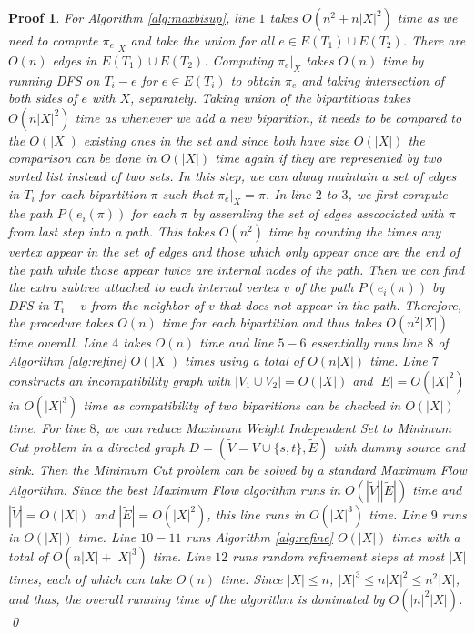 \documentclass{bmcart}
\theoremstyle{mystyle}
\theoremstyle{proofstyle}
\newtheorem*{proof2}{Proof}
\newenvironment{proofnospace}{\begin{proof2}}{\qed \end{proof2}}
\begin{document}
\begin{proofnospace}
For Algorithm \ref{alg:maxbisup}, line $1$ takes $O(n^2+ n|X|^2)$ time as we need to compute $\pi_e|_X$ and take the union for all $e \in E(T_1) \cup E(T_2)$. There are $O(n)$ edges in $E(T_1) \cup E(T_2)$. Computing $\pi_e|_X$ takes $O(n)$ time by running DFS on $T_i - e$ for $e \in E(T_i)$ to obtain $\pi_e$ and taking intersection of both sides of $e$ with $X$, separately. Taking union of the bipartitions takes $O(n |X|^2)$ time as whenever we add a new biparition, it needs to be compared to the $O(|X|)$ existing ones in the set and since both have size $O(|X|)$ the comparison can be done in $O(|X|)$ time again if they are represented by two sorted list instead of two sets. In this step, we can alway maintain a set of edges in $T_i$ for each bipartition $\pi$ such that $\pi_e|_X = \pi$. In line $2$ to $3$, we first compute the path $P(e_i(\pi))$ for each $\pi$ by assemling the set of edges asscociated with $\pi$ from last step into a path. This takes $O(n^2)$ time by counting the times any vertex appear in the set of edges and those which only appear once are the end of the path while those appear twice are internal nodes of the path. Then we can find the extra subtree attached to each internal vertex $v$ of the path $P(e_i(\pi))$ by DFS in $T_i - v$ from the neighbor of $v$ that does not appear in the path. Therefore, the procedure takes $O(n)$ time for each bipartition and thus takes $O(n^2|X|)$ time overall. Line $4$ takes $O(n)$ time and line $5-6$ essentially runs line $8$ of Algorithm \ref{alg:refine} $O(|X|)$ times using a total of $O(n|X|)$ time. Line $7$ constructs an incompatibility graph with $|V_1\cup V_2| = O(|X|)$ and $|E| = O(|X|^2)$ in $O(|X|^3)$ time as compatibility of two biparitions can be checked in $O(|X|)$ time. For line $8$, we can reduce Maximum Weight Independent Set to Minimum Cut problem in a directed graph $D = (\tilde{V} = V \cup \{s,t\}, \tilde{E})$ with dummy source and sink. Then the Minimum Cut problem can be solved by a standard Maximum Flow Algorithm. Since the best Maximum Flow algorithm runs in $O(|\tilde{V}||\tilde{E}|)$ time and $|\tilde{V}| = O(|X|)$ and $|\tilde{E}| = O(|X|^2)$, this line runs in $O(|X|^3)$ time. Line $9$ runs in $O(|X|)$ time. Line $10-11$ runs Algorithm \ref{alg:refine} $O(|X|)$ times with a total of $O(n|X|+|X|^3)$ time. Line $12$ runs random refinement steps at most $|X|$ times, each of which can take $O(n)$ time. Since $|X| \le n$, $|X|^3 \le n|X|^2 \le n^2|X|$, and thus, the overall running time of the algorithm is donimated by $O(|n|^2|X|)$.
\end{proofnospace}
\end{document}

